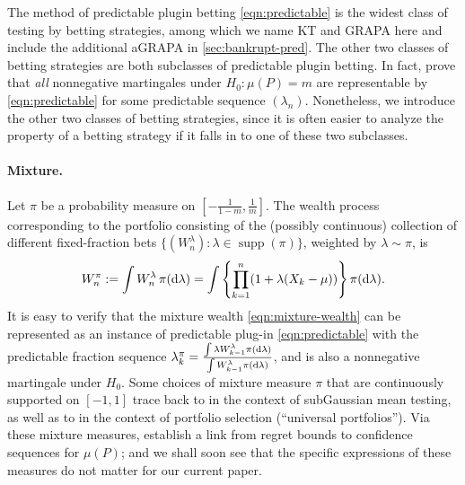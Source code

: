 The method of predictable plugin betting \eqref{eqn:predictable} is the widest class of testing by betting strategies, among which we name KT and GRAPA here and include the additional aGRAPA in \cref{sec:bankrupt-pred}. The other two classes of betting strategies are both subclasses of predictable plugin betting. In fact, \citet[Proposition 2]{waudby2024estimating} prove that \emph{all} nonnegative martingales under $H_0:\mu(P)=m$ are representable by \eqref{eqn:predictable} for some predictable sequence $(\lambda_n)$. Nonetheless, we introduce the other two classes of betting strategies, since it is often easier to analyze the property of a betting strategy if it falls in to one of these two subclasses.

\paragraph{Mixture.} Let $\pi$ be a probability measure on $[-\frac{1}{1-m},\frac{1}{m}]$. The wealth process corresponding to the portfolio consisting of the (possibly continuous) collection of different fixed-fraction bets $\{(W_n^\lambda) : \lambda \in \operatorname{supp}(\pi) \}$, weighted by $\lambda \sim \pi$, is
\begin{equation}\label{eqn:mixture-wealth}
    W_n^\pi := \int W_n^\lambda \, \pi(\mathrm{d} \lambda) = \int \left\{\prod_{k=1}^n (1 + \lambda(X_k - \mu))  \right\} \pi(\mathrm{d} \lambda).
\end{equation}
It is easy to verify that the mixture wealth \eqref{eqn:mixture-wealth} can be represented as an instance of predictable plug-in \eqref{eqn:predictable} with the predictable fraction sequence $\lambda_k^\pi = \frac{\int \lambda W_{k-1}^\lambda  \pi(\mathrm{d} \lambda) }{ \int W_{k-1}^\lambda  \pi(\mathrm{d} \lambda) }$, and is also a nonnegative martingale under $H_0$.
Some choices of mixture measure $\pi$ that are continuously supported on $[-1,1]$ trace back to \cite{robbins1970statistical} in the context of subGaussian mean testing, as well as to \cite{cover1991universal,cover2002universal} in the context of portfolio selection (``universal portfolios''). Via these mixture measures, \cite{orabona2023tight} establish a link from regret bounds to confidence sequences for $\mu(P)$; and
we shall soon see that the specific expressions of these measures do not matter for our current paper.


